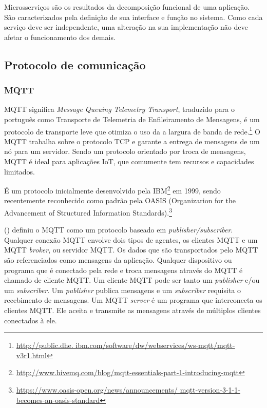 Microsserviços são os resultados da decomposição funcional de uma aplicação. São caracterizados pela definição de sua interface e função no sistema. Como cada serviço deve ser independente, uma alteração na sua implementação não deve afetar o funcionamento dos demais. \cite{Pahl}

\subsection{Protocolo de comunicação}

\subsubsection{MQTT}

MQTT significa \textit{Message Queuing Telemetry Transport}, traduzido para o português como Transporte de Telemetria de Enfileiramento de Mensagens, é um protocolo de transporte leve que otimiza o uso da a largura de banda de rede.\footnote{\url{http://public.dhe. ibm.com/software/dw/webservices/ws-mqtt/mqtt-v3r1.html}} O MQTT trabalha sobre o protocolo TCP e garante a entrega de mensagens de um nó para um servidor. Sendo um protocolo orientado por troca de mensagens, MQTT é ideal para aplicações IoT, que comumente tem recursos e capacidades limitados.

É um protocolo inicialmente desenvolvido pela IBM\footnote{\url{http://www.hivemq.com/blog/mqtt-essentials-part-1-introducing-mqtt}} em 1999, sendo recentemente reconhecido como padrão pela OASIS (Organizarion for the Advancement of Structured Information Standards).\footnote{\url{https://www.oasis-open.org/news/announcements/ mqtt-version-3-1-1-becomes-an-oasis-standard}}

\citeauthor{Kodali2017} (\citeyear{Kodali2017}) definiu o MQTT como um protocolo baseado em \textit {publisher/subscriber}. Qualquer conexão MQTT envolve dois tipos de agentes, os clientes MQTT e um MQTT \textit {broker}, ou servidor MQTT. Os dados que são transportados pelo MQTT são referenciados como mensagens da aplicação. Qualquer dispositivo ou programa que é conectado pela rede e troca mensagens através do MQTT é chamado de cliente MQTT. Um cliente MQTT pode ser tanto um \textit {publisher} e/ou um \textit {subscriber}. Um \textit {publisher} publica mensagens e um \textit {subscriber} requisita o recebimento de mensagens. Um MQTT \textit {server} é um programa que interconecta os clientes MQTT. Ele aceita e transmite as mensagens através de múltiplos clientes conectados à ele.

